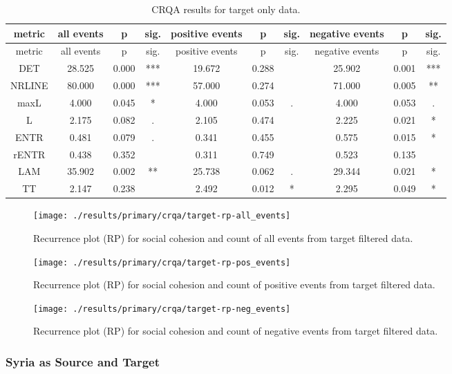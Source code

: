 \documentclass[english,man]{apa6}
\begin{document}
\begin{longtable}[]{@{}cccccccccc@{}}
\caption{\label{table-1}CRQA results for target only data.}\tabularnewline
\toprule
metric & all events & p & sig. & positive events & p & sig. & negative events & p & sig.\tabularnewline
\midrule
\endfirsthead
\toprule
metric & all events & p & sig. & positive events & p & sig. & negative events & p & sig.\tabularnewline
\midrule
\endhead
DET & 28.525 & 0.000 & *** & 19.672 & 0.288 & & 25.902 & 0.001 & ***\tabularnewline
NRLINE & 80.000 & 0.000 & *** & 57.000 & 0.274 & & 71.000 & 0.005 & **\tabularnewline
maxL & 4.000 & 0.045 & * & 4.000 & 0.053 & . & 4.000 & 0.053 & .\tabularnewline
L & 2.175 & 0.082 & . & 2.105 & 0.474 & & 2.225 & 0.021 & *\tabularnewline
ENTR & 0.481 & 0.079 & . & 0.341 & 0.455 & & 0.575 & 0.015 & *\tabularnewline
rENTR & 0.438 & 0.352 & & 0.311 & 0.749 & & 0.523 & 0.135 &\tabularnewline
LAM & 35.902 & 0.002 & ** & 25.738 & 0.062 & . & 29.344 & 0.021 & *\tabularnewline
TT & 2.147 & 0.238 & & 2.492 & 0.012 & * & 2.295 & 0.049 & *\tabularnewline
\bottomrule
\end{longtable}

\begin{figure}
\texttt{[image: ./results/primary/crqa/target-rp-all\_events]} \caption{Recurrence plot (RP) for social cohesion and count of all events from target filtered data.}\label{fig:plot-rp-targ-all}
\end{figure}

\begin{figure}
\texttt{[image: ./results/primary/crqa/target-rp-pos\_events]} \caption{Recurrence plot (RP) for social cohesion and count of positive events from target filtered data.}\label{fig:plot-rp-targ-pos}
\end{figure}

\begin{figure}
\texttt{[image: ./results/primary/crqa/target-rp-neg\_events]} \caption{Recurrence plot (RP) for social cohesion and count of negative events from target filtered data.}\label{fig:plot-rp-targ-neg}
\end{figure}

\hypertarget{syria-as-source-and-target}{%
\subsubsection{Syria as Source and Target}\label{syria-as-source-and-target}}
\end{document}

